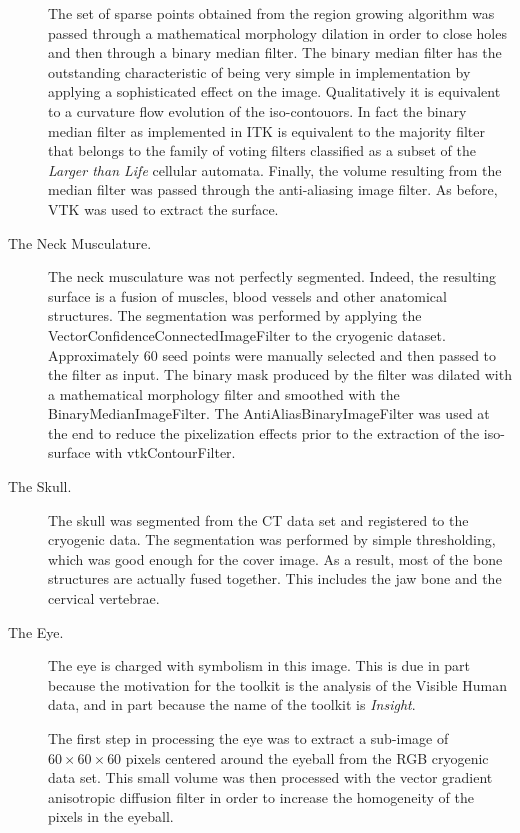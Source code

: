 \begin{description}
The set of sparse points obtained from the region growing algorithm was
passed through a mathematical morphology dilation in order to close holes and
then through a binary median filter. The binary median filter has the
outstanding characteristic of being very simple in implementation by applying
a sophisticated effect on the image. Qualitatively it is equivalent to a
curvature flow evolution of the iso-contouors. In fact the binary median
filter as implemented in ITK is equivalent to the majority filter that
belongs to the family of voting filters classified as a subset of the
\emph{Larger than Life} cellular automata. Finally, the volume resulting from
the median filter was passed through the anti-aliasing image filter. As
before, VTK was used to extract the surface.

\item[The Neck Musculature.]
The neck musculature was not perfectly segmented. Indeed, the resulting
surface is a fusion of muscles, blood vessels and other anatomical
structures. The segmentation was performed by applying the
VectorConfidenceConnectedImageFilter to the cryogenic dataset. Approximately
60 seed points were manually selected and then passed to the filter as
input. The binary mask produced by the filter was dilated with a mathematical
morphology filter and smoothed with the BinaryMedianImageFilter. The
AntiAliasBinaryImageFilter was used at the end to reduce the pixelization
effects prior to the extraction of the iso-surface with vtkContourFilter.

\item[The Skull.]
The skull was segmented from the CT data set and registered to the cryogenic
data. The segmentation was performed by simple thresholding, which was good
enough for the cover image. As a result, most of the bone structures are
actually fused together. This includes the jaw bone and the cervical
vertebrae.

\item[The Eye.] 
The eye is charged with symbolism in this image. This is due in part because
the motivation for the toolkit is the analysis of the Visible Human data,
and in part because the name of the toolkit is \emph{Insight}.

The first step in processing the eye was to extract a sub-image of
$60\times60\times60$ pixels centered around the eyeball from the RGB
cryogenic data set. This small volume was then processed with the vector
gradient anisotropic diffusion filter in order to increase the homogeneity of
the pixels in the eyeball.


\end{description}
